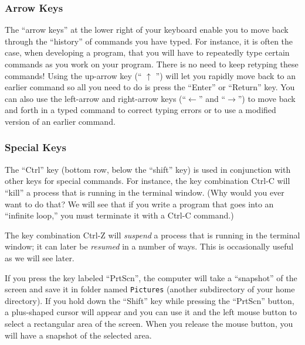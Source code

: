 \subsubsection*{Arrow Keys}
\vspace{-0.1in}
The ``arrow keys'' at the lower right of your keyboard enable you to
move back through the ``history'' of commands you have typed. For instance,
it is often the case, when developing a program, that you will
have to repeatedly type certain commands
as you work on your program. There is no need to keep retyping these
commands! Using the up-arrow key (`` $\uparrow$ '') will let you rapidly
move back to an earlier command so all you need to do is press the 
``Enter'' or ``Return'' key. You can also use the left-arrow and 
right-arrow keys (``$\leftarrow$'' and ``$\rightarrow$'') to move back
and forth in a typed command to correct typing errors or to use a
modified version of an earlier command. 

\vspace{-0.2in}
\subsubsection*{Special Keys}
\vspace{-0.1in}
The ``Ctrl'' key (bottom row, below the ``shift'' key) is used in
conjunction with other keys for special commands. For
instance, the key combination Ctrl-C will ``kill'' a process that is
running in the terminal window. (Why would you ever want to do that?
We will see that if you write a program that goes into an ``infinite
loop,'' you must terminate it with a Ctrl-C command.)

\noindent The key combination Ctrl-Z will {\em suspend} a process that is
running in the terminal window; it can later be {\em resumed} in a
number of ways. This is occasionally useful as we will see later.

\noindent If you press the key labeled ``PrtScn'', the computer 
will take a ``snapshot'' of the screen and save it in 
folder named {\tt Pictures} (another subdirectory of your home directory).
If you hold down the ``Shift'' key while pressing the ``PrtScn'' button,
a plus-shaped cursor will appear and you can use it and the left mouse 
button to select a rectangular area of the screen. When you release the
mouse button, you will have a snapshot of the selected area.

\vspace{-0.1in}
